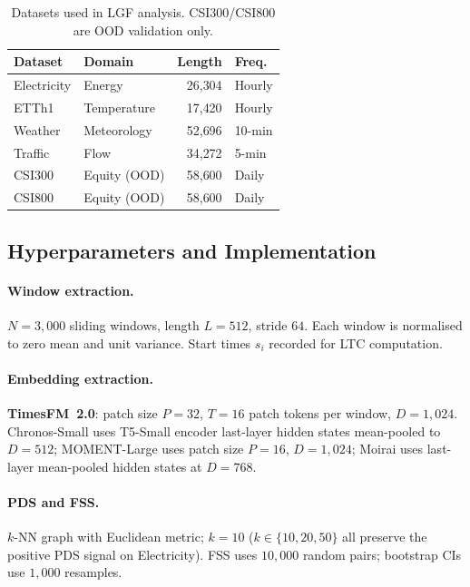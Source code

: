 \documentclass[10pt]{article}
\theoremstyle{definition}
\theoremstyle{remark}
\begin{document}
\begin{table}[h]
\centering
\caption{Datasets used in LGF analysis. CSI300/CSI800 are OOD validation only.}
\label{tab:datasets}
\small
\setlength{\tabcolsep}{6pt}
\begin{tabular}{llrl}
\toprule
\textbf{Dataset} & \textbf{Domain} & \textbf{Length} & \textbf{Freq.}\\
\midrule
Electricity & Energy       & 26{,}304 & Hourly \\
ETTh1       & Temperature  & 17{,}420 & Hourly \\
Weather     & Meteorology  & 52{,}696 & 10-min \\
Traffic     & Flow         & 34{,}272 & 5-min  \\
\midrule
CSI300      & Equity (OOD) & 58{,}600 & Daily  \\
CSI800      & Equity (OOD) & 58{,}600 & Daily  \\
\bottomrule
\end{tabular}
\end{table}

\subsection{Hyperparameters and Implementation}

\paragraph{Window extraction.}
$N=3{,}000$ sliding windows, length $L=512$, stride $64$.
Each window is normalised to zero mean and unit variance.
Start times $s_i$ recorded for LTC computation.

\paragraph{Embedding extraction.}
\textbf{TimesFM~2.0}: patch size $P=32$, $T=16$ patch tokens per window,
$D=1{,}024$.
Chronos-Small uses T5-Small encoder last-layer hidden states mean-pooled to
$D=512$; MOMENT-Large uses patch size $P=16$, $D=1{,}024$; Moirai uses
last-layer mean-pooled hidden states at $D=768$.

\paragraph{PDS and FSS.}
$k$-NN graph with Euclidean metric; $k=10$
($k\in\{10,20,50\}$ all preserve the positive PDS signal on Electricity).
FSS uses $10{,}000$ random pairs; bootstrap CIs use $1{,}000$ resamples.
\end{document}
